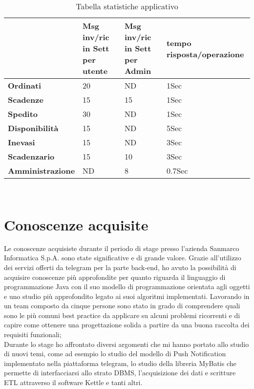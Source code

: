   \clearpage

\begin{table}
\begin{tabular}{ |p{3cm}|p{3cm}|p{3cm}|p{3cm}| }

 \hline
   & \textbf{Msg inv/ric in Sett per utente}    &  \textbf{Msg inv/ric in Sett per Admin}  &  \textbf{tempo risposta/operazione}\\ 
 \hline
  \textbf{Ordinati} &  20   & ND & 1Sec\\

 \hline
  \textbf{Scadenze} &  15   & 15 & 1Sec\\
 \hline
   \textbf{Spedito} &  30   & ND & 1Sec\\
 \hline
    \textbf{Disponibilità} &  15   & ND & 5Sec\\
 \hline
   \textbf{Inevasi} &  15   & ND & 3Sec\\
 \hline
    \textbf{Scadenzario} &  15   & 10 & 3Sec\\
 \hline
    \textbf{Amministrazione} &  ND   & 8 & 0.7Sec\\
 \hline
\end{tabular}
\\
\caption{Tabella statistiche applicativo }
\end{table}




\section{Conoscenze acquisite}
Le conoscenze acquisiste durante il periodo di stage presso l'azienda Sanmarco Informatica S.p.A. sono state significative e di grande valore. Grazie all'utilizzo dei servizi offerti da telegram per la parte back-end, ho avuto la possibilità di acquisire conoscenze più approfondite per quanto riguarda il linguaggio di programmazione Java con il suo modello di programmazione orientata agli oggetti e uno studio più approfondito legato ai suoi algoritmi implementati. Lavorando in un team composto da cinque persone sono stato in grado di comprendere quali sono le più comuni best practice da applicare su alcuni problemi ricorrenti e di capire  come ottenere una progettazione solida a partire da una buona raccolta dei requisiti funzionali; \\ Durante lo stage ho affrontato diversi argomenti che mi hanno portato allo studio di nuovi temi, come ad esempio lo studio del modello di Push Notification implementato nella piattaforma telegram, lo studio della libreria MyBatis che permette di interfacciarsi allo strato DBMS, l'acquisizione dei dati e scritture ETL attraverso il software Kettle e tanti altri. 

